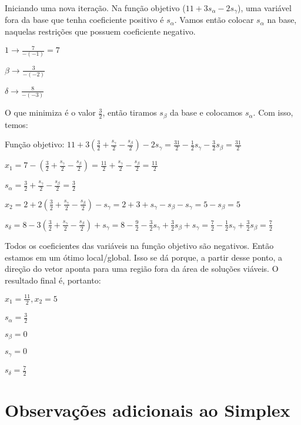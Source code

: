 Iniciando uma nova iteração. Na função objetivo ($11+3s_\alpha-2s_\gamma$), uma variável fora da base que tenha coeficiente positivo é $s_\alpha$. Vamos então colocar $s_\alpha$ na base, naquelas restrições que possuem coeficiente negativo.

\begin{example}
    $1 \to \frac{7}{-(-1)} = 7$

    $\beta \to \frac{3}{-(-2)}$

    $\delta \to \frac{8}{-(-3)}$
\end{example}

O que minimiza é o valor $\frac{3}{2}$, então tiramos $s_\beta$ da base e colocamos $s_\alpha$. Com isso, temos:

\begin{example}
    Função objetivo: $11+3(\frac{3}{2}+\frac{s_\gamma}{2}-\frac{s_\beta}{2})-2s_\gamma=\frac{31}{2}-\frac{1}{2}s_\gamma-\frac{3}{2}s_\beta = \frac{31}{2}$

    $x_1 = 7 - (\frac{3}{2}+\frac{s_\gamma}{2}-\frac{s_\beta}{2}) = \frac{11}{2}+\frac{s_\gamma}{2}-\frac{s_\beta}{2} = \frac{11}{2}$

    $s_\alpha = \frac{3}{2}+\frac{s_\gamma}{2}-\frac{s_\beta}{2} = \frac{3}{2}$

    $x_2=2+2(\frac{3}{2}+\frac{s_\gamma}{2}-\frac{s_\beta}{2})-s_\gamma=2+3+s_\gamma-s_\beta-s_\gamma=5-s_\beta=5$

    $s_\delta = 8-3(\frac{3}{2}+\frac{s_\gamma}{2}-\frac{s_\beta}{2})+s_\gamma=8-\frac{9}{2}-\frac{3}{2}s_\gamma+\frac{3}{2}s_\beta+s_\gamma=\frac{7}{2}-\frac{1}{2}s_\gamma+\frac{3}{2}s_\beta=\frac{7}{2}$
\end{example}

Todos os coeficientes das variáveis na função objetivo são negativos. Então estamos em um ótimo local/global. Isso se dá porque, a partir desse ponto, a direção do vetor aponta para uma região fora da área de soluções viáveis. O resultado final é, portanto:

\begin{example}
    $x_1=\frac{11}{2}, x_2=5$

    $s_\alpha=\frac{3}{2}$

    $s_\beta=0$

    $s_\gamma=0$

    $s_\delta=\frac{7}{2}$
\end{example}

\section{Observações adicionais ao Simplex}

